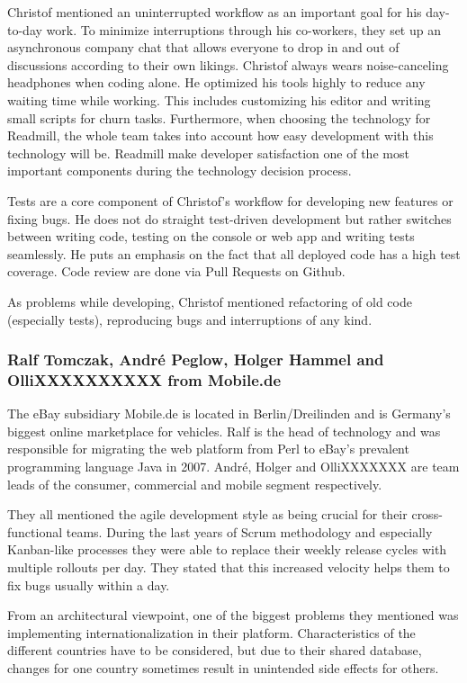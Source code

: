 Christof mentioned an uninterrupted workflow as an important goal for his day-to-day work. To minimize interruptions through his co-workers, they set up an asynchronous company chat that allows everyone to drop in and out of discussions according to their own likings. Christof always wears noise-canceling headphones when coding alone. He optimized his tools highly to reduce any waiting time while working. This includes customizing his editor and writing small scripts for churn tasks. Furthermore, when choosing the technology for Readmill, the whole team takes into account how easy development with this technology will be. Readmill make developer satisfaction one of the most important components during the technology decision process.

Tests are a core component of Christof's workflow for developing new features or fixing bugs. He does not do straight test-driven development but rather switches between writing code, testing on the console or web app and writing tests seamlessly. He puts an emphasis on the fact that all deployed code has a high test coverage. Code review are done via Pull Requests on Github.

As problems while developing, Christof mentioned refactoring of old code (especially tests), reproducing bugs and interruptions of any kind.

\subsubsection{Ralf Tomczak, Andr\'e Peglow, Holger Hammel and OlliXXXXXXXXXX from Mobile.de}
The eBay subsidiary Mobile.de is located in Berlin/Dreilinden and is Germany's biggest online marketplace for vehicles. Ralf is the head of technology and was responsible for migrating the web platform from Perl to eBay's prevalent programming language Java in 2007. Andr\'e, Holger and OlliXXXXXXX  are team leads of the consumer, commercial and mobile segment respectively.

They all mentioned the agile development style as being crucial for their cross-functional teams. During the last years of Scrum methodology and especially Kanban-like processes they were able to replace their weekly release cycles with multiple rollouts per day. They stated that this increased velocity helps them to fix bugs usually within a day.

From an architectural viewpoint, one of the biggest problems they mentioned was implementing internationalization in their platform. Characteristics of the different countries have to be considered, but due to their shared database, changes for one country sometimes result in unintended side effects for others.

